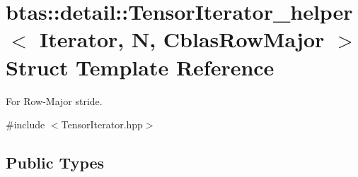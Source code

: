 \hypertarget{structbtas_1_1detail_1_1_tensor_iterator__helper_3_01_iterator_00_01_n_00_01_cblas_row_major_01_4}{
\section{btas::detail::TensorIterator\_\-helper$<$ Iterator, N, CblasRowMajor $>$ Struct Template Reference}
\label{structbtas_1_1detail_1_1_tensor_iterator__helper_3_01_iterator_00_01_n_00_01_cblas_row_major_01_4}
}


For Row-\/Major stride.  


{\ttfamily \#include $<$TensorIterator.hpp$>$}\subsection*{Public Types}
